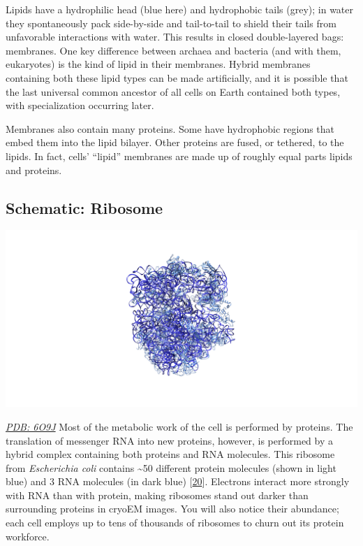\documentclass[]{tufte-book}
\begin{document}
Lipids have a hydrophilic head (blue here) and hydrophobic tails (grey); in water they spontaneously pack side-by-side and tail-to-tail to shield their tails from unfavorable interactions with water. This results in closed double-layered bags: membranes. One key difference between archaea and bacteria (and with them, eukaryotes) is the kind of lipid in their membranes. Hybrid membranes containing both these lipid types can be made artificially, and it is possible that the last universal common ancestor of all cells on Earth contained both types, with specialization occurring later.

Membranes also contain many proteins. Some have hydrophobic regions that embed them into the lipid bilayer. Other proteins are fused, or tethered, to the lipids. In fact, cells' ``lipid'' membranes are made up of roughly equal parts lipids and proteins.

\hypertarget{Ribosome}{%
\subsection*{Schematic: Ribosome}\label{Ribosome}}

\includegraphics{img/schematics/2_1_2}

\href{http://rcsb.org/structure/6O9J}{\emph{PDB: 6O9J}}
Most of the metabolic work of the cell is performed by proteins. The translation of messenger RNA into new proteins, however, is performed by a hybrid complex containing both proteins and RNA molecules. This ribosome from \emph{Escherichia coli} contains \textasciitilde{}50 different protein molecules (shown in light blue) and 3 RNA molecules (in dark blue) {[}\protect\hyperlink{ref-kaledhonkar2019}{20}{]}. Electrons interact more strongly with RNA than with protein, making ribosomes stand out darker than surrounding proteins in cryoEM images. You will also notice their abundance; each cell employs up to tens of thousands of ribosomes to churn out its protein workforce.
\end{document}
